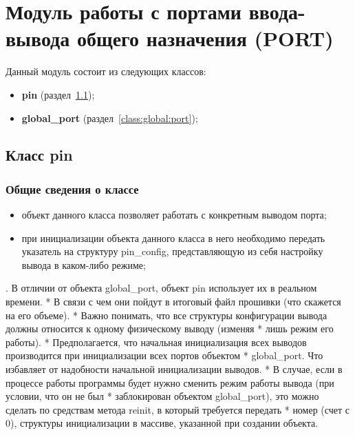 \section{Модуль работы с портами ввода-вывода общего назначения (PORT)}\label{port:0}
Данный модуль состоит из следующих классов:
\begin{itemize}
	\item \textbf{pin} (раздел~\ref{class:pin});
	\item \textbf{global\_port} (раздел~\ref{class:global:port});
\end{itemize}

\subsection{Класс pin}\label{class:pin}
\subsubsection{Общие сведения о классе}
\begin{itemize}
	\item объект данного класса позволяет работать с конкретным выводом порта;
	\item при инициализации объекта данного класса в него необходимо передать указатель на структуру pin\_config, представляющую из себя  настройку вывода в каком-либо режиме;
\end{itemize}
. В отличии от объекта global\_port, объект pin использует их в реальном времени.
* В связи с чем они пойдут в итоговый файл прошивки (что скажется на его объеме).
* Важно понимать, что все структуры конфигурации вывода должны относится к одному физическому выводу (изменяя
* лишь режим его работы).
* Предполагается, что начальная инициализация всех выводов производится при инициализации всех портов объектом
* global\_port. Что избавляет от надобности начальной инициализации выводов.
* В случае, если в процессе работы программы будет нужно сменить режим работы вывода (при условии, что он не был
* заблокирован объектом global\_port), это можно сделать по средствам метода reinit, в который требуется передать
* номер (счет с 0), структуры инициализации в массиве, указанной при создании объекта.
